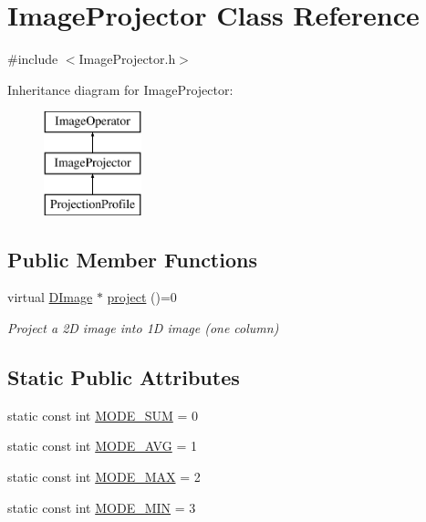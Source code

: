 \hypertarget{class_image_projector}{\section{Image\+Projector Class Reference}
\label{class_image_projector}
}


{\ttfamily \#include $<$Image\+Projector.\+h$>$}

Inheritance diagram for Image\+Projector\+:\begin{figure}[H]
\begin{center}
\leavevmode
\includegraphics[height=3.000000cm]{class_image_projector}
\end{center}
\end{figure}
\subsection*{Public Member Functions}
\begin{DoxyCompactItemize}
\item 
virtual \hyperlink{class_d_image}{D\+Image} $\ast$ \hyperlink{class_image_projector_a3dd19fda98e15001d7cbf5b8ca1b4b40}{project} ()=0
\begin{DoxyCompactList}\small\item\em Project a 2\+D image into 1\+D image (one column) \end{DoxyCompactList}\end{DoxyCompactItemize}
\subsection*{Static Public Attributes}
\begin{DoxyCompactItemize}
\item 
static const int \hyperlink{class_image_projector_aa4f984418252e6203b04e4dcb5ab8183}{M\+O\+D\+E\+\_\+\+S\+U\+M} = 0
\item 
static const int \hyperlink{class_image_projector_a1f021faf00677be6e1bafdbf1f308ae2}{M\+O\+D\+E\+\_\+\+A\+V\+G} = 1
\item 
static const int \hyperlink{class_image_projector_a7b0d00775b3caaa86260c7e16771ef8d}{M\+O\+D\+E\+\_\+\+M\+A\+X} = 2
\item 
static const int \hyperlink{class_image_projector_a18c6aaf382882c18e38fba9058348d4b}{M\+O\+D\+E\+\_\+\+M\+I\+N} = 3
\end{DoxyCompactItemize}
